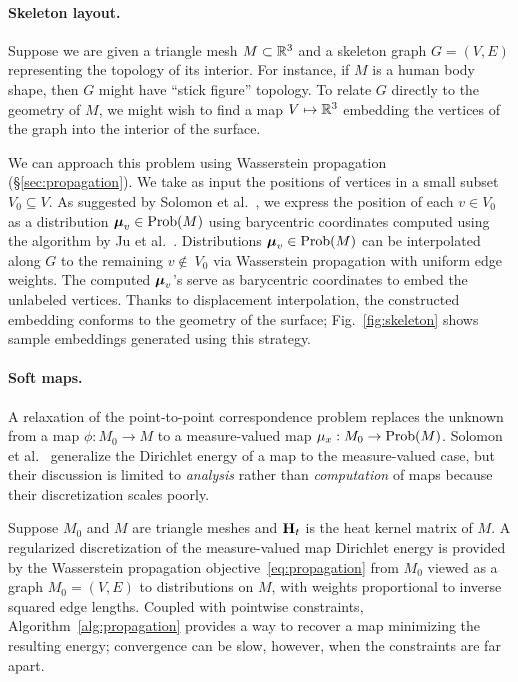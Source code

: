 \paragraph*{Skeleton layout.} 

Suppose we are given a triangle mesh $M\subset\mathbb{R}^3$ and a skeleton graph $G=(V,E)$ representing the topology of its interior.  For instance, if $M$ is a human body shape, then $G$ might have ``stick figure'' topology.  To relate $G$ directly to the geometry of $M$, we might wish to find a map $V\mapsto\mathbb{R}^3$ embedding the vertices of the graph into the interior of the surface.   

We can approach this problem using Wasserstein propagation (\S\ref{sec:propagation}).  We take as input the positions of vertices in a small subset $V_0\subseteq V$.  As suggested by Solomon et al.~, we express the position of each $v\in V_0$ as a distribution $\boldsymbol{\mu}_v\in\mathrm{Prob}(M)$ using barycentric coordinates computed using the algorithm by Ju et al.~.  Distributions $\boldsymbol{\mu}_v\in\mathrm{Prob}(M)$ can be interpolated along $G$ to the remaining $v\not\in\ V_0$ via Wasserstein propagation with uniform edge weights.  The computed $\boldsymbol{\mu}_v$'s serve as barycentric coordinates to embed the unlabeled vertices.  Thanks to displacement interpolation, the constructed embedding conforms to the geometry of the surface; Fig.~\ref{fig:skeleton} shows sample embeddings generated using this strategy.




\paragraph*{Soft maps.}  

A relaxation of the point-to-point correspondence problem replaces the unknown from a map $\phi:M_0\rightarrow M$ to a measure-valued map $\mu_x:M_0\rightarrow\mathrm{Prob}(M)$.  Solomon et al.~ generalize the Dirichlet energy of a map to the measure-valued case, but their discussion is limited to \emph{analysis} rather than \emph{computation} of maps because their discretization scales poorly.

Suppose $M_0$ and $M$ are triangle meshes and $\mathbf{H}_t$ is the heat kernel matrix of $M$.  A regularized discretization of the measure-valued map Dirichlet energy is provided by the Wasserstein propagation objective~\eqref{eq:propagation} from $M_0$ viewed as a graph $M_0=(V,E)$ to distributions on $M$, with weights proportional to inverse squared edge lengths.  Coupled with pointwise constraints, Algorithm~\ref{alg:propagation} provides a way to recover a map minimizing the resulting energy; convergence can be slow, however, when the constraints are far apart.

